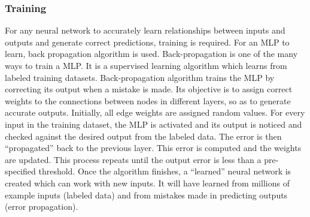 \subsubsection{Training}
\label{sect5_1_1_2}
For any neural network to accurately learn relationships between inputs and outputs and generate correct predictions, training is required. For an MLP to learn, back propagation algorithm is used.\newline\newline
Back-propagation is one of the many ways to train a MLP. It is a supervised learning algorithm which learns from labeled training datasets. Back-propagation algorithm trains the MLP by correcting its output when a mistake is made. Its objective is to assign correct weights to the connections between nodes in different layers, so as to generate accurate outputs. \newline\newline
Initially, all edge weights are assigned random values. For every input in the training dataset, the MLP is activated and its output is noticed and checked against the desired output from the labeled data. The error is then “propagated” back to the previous layer. This error is computed and the weights are updated. This process repeats until the output error is less than a pre-specified threshold.\newline\newline
Once the algorithm finishes, a “learned” neural network is created which can work with new inputs. It will have learned from millions of example inputs (labeled data) and from mistakes made in predicting outputs (error propagation).

